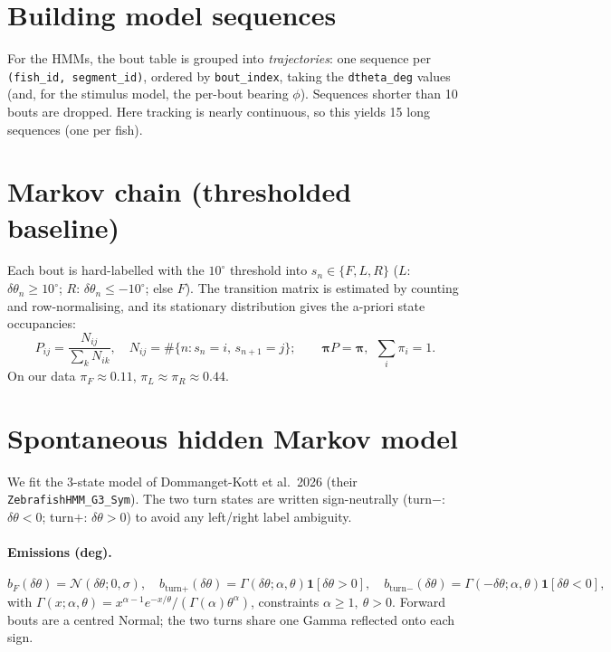 \documentclass[11pt]{article}
\begin{document}
\section{Building model sequences}

For the HMMs, the bout table is grouped into \emph{trajectories}: one sequence
per \texttt{(fish\_id, segment\_id)}, ordered by \texttt{bout\_index}, taking the
\texttt{dtheta\_deg} values (and, for the stimulus model, the per-bout bearing
$\phi$). Sequences shorter than 10 bouts are dropped. Here tracking is nearly
continuous, so this yields 15 long sequences (one per fish).


\section{Markov chain (thresholded baseline)}

Each bout is hard-labelled with the $10^\circ$ threshold into $s_n\in\{F,L,R\}$
($L$: $\delta\theta_n\ge10^\circ$; $R$: $\delta\theta_n\le-10^\circ$; else $F$).
The transition matrix is estimated by counting and row-normalising, and its
stationary distribution gives the a-priori state occupancies:
\begin{equation}
P_{ij}=\frac{N_{ij}}{\sum_k N_{ik}},\quad
N_{ij}=\#\{n:s_n=i,\,s_{n+1}=j\};\qquad
\boldsymbol\pi P=\boldsymbol\pi,\ \ \textstyle\sum_i\pi_i=1 .
\end{equation}
On our data $\pi_F\approx0.11$, $\pi_L\approx\pi_R\approx0.44$.


\section{Spontaneous hidden Markov model}
\label{sec:hmm}

We fit the 3-state model of Dommanget-Kott et al.\ 2026 (their
\texttt{ZebrafishHMM\_G3\_Sym}). The two turn states are written sign-neutrally
(turn$-$: $\delta\theta<0$; turn$+$: $\delta\theta>0$) to avoid any left/right
label ambiguity.

\paragraph{Emissions (deg).}
\begin{equation}
b_F(\delta\theta)=\mathcal N(\delta\theta;0,\sigma),\quad
b_{\text{turn}+}(\delta\theta)=\Gamma(\delta\theta;\alpha,\theta)\mathbf 1[\delta\theta{>}0],\quad
b_{\text{turn}-}(\delta\theta)=\Gamma(-\delta\theta;\alpha,\theta)\mathbf 1[\delta\theta{<}0],
\end{equation}
with $\Gamma(x;\alpha,\theta)=x^{\alpha-1}e^{-x/\theta}/(\Gamma(\alpha)\theta^\alpha)$,
constraints $\alpha\ge1,\ \theta>0$. Forward bouts are a centred Normal; the two
turns share one Gamma reflected onto each sign.
\end{document}

